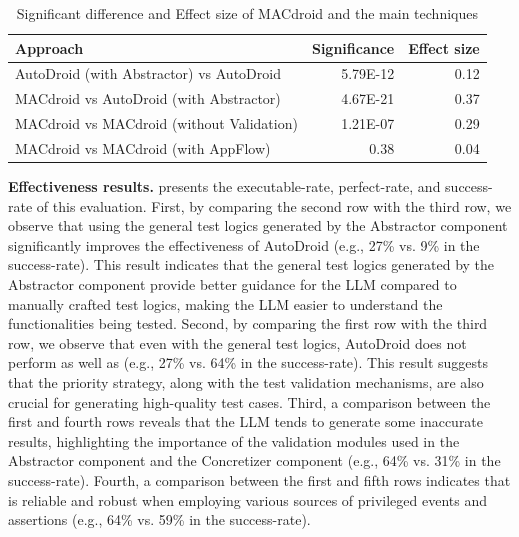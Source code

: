 \begin{table}[t]
  \centering
  \caption{Significant difference and Effect size of MACdroid and the main techniques}
    \begin{tabular}{l|r|r}
    \toprule
    \textbf{Approach} & \multicolumn{1}{l|}{\textbf{Significance}} & \multicolumn{1}{l}{\textbf{Effect size}} \\
    \midrule
    AutoDroid (with Abstractor) vs AutoDroid & \textcolor[rgb]{ 1,  0,  0}{5.79E-12} & 0.12  \\
    MACdroid vs AutoDroid (with Abstractor) & \textcolor[rgb]{ 1,  0,  0}{4.67E-21} & \textcolor[rgb]{ 1,  0,  0}{ 0.37} \\
    MACdroid vs MACdroid (without Validation) & \textcolor[rgb]{ 1,  0,  0}{1.21E-07} &  0.29 \\
    MACdroid vs MACdroid (with AppFlow) & 0.38  & 0.04  \\
    \bottomrule
    \end{tabular}%
  \label{tab:significant-rq2}%
\end{table}%















\textbf{Effectiveness results.}
 presents the executable-rate, perfect-rate, and success-rate of this evaluation.
First, by comparing the second row with the third row, we observe that using the general test logics generated by the Abstractor component significantly improves the effectiveness of AutoDroid (e.g., 27\% vs. 9\% in the success-rate). This result indicates that the general test logics generated by the Abstractor component provide better guidance for the LLM compared to manually crafted test logics, making the LLM easier to understand the functionalities being tested. 
Second, by comparing the first row with the third row, we observe that even with the general test logics, AutoDroid does not perform as well as \toolNameSmall{} (e.g., 27\% vs. 64\% in the success-rate). This result suggests that the priority strategy, along with the test validation mechanisms, are also crucial for generating high-quality test cases.
Third, a comparison between the first and fourth rows reveals that the LLM tends to generate some inaccurate results, highlighting the importance of the validation modules used in the Abstractor component and the Concretizer component (e.g., 64\% vs. 31\% in the success-rate).
Fourth, a comparison between the first and fifth rows indicates that \toolNameSmall{} is reliable and robust when employing various sources of privileged events and assertions (e.g., 64\% vs. 59\% in the success-rate).

